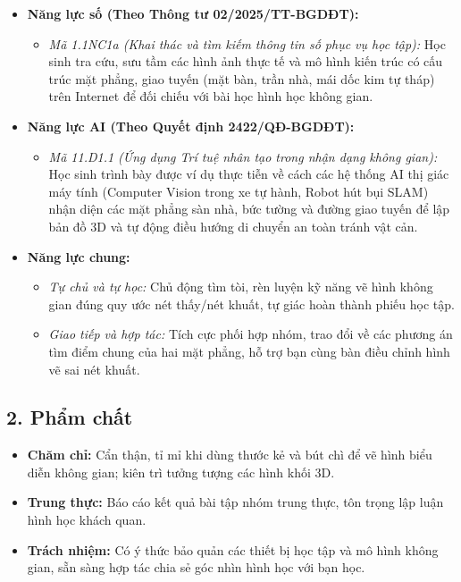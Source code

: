 \documentclass[12pt, a4paper]{article}
\begin{document}
\begin{itemize}[leftmargin=1.2cm]
    \item \textbf{Năng lực số (Theo Thông tư 02/2025/TT-BGDĐT):}
    \begin{itemize}[leftmargin=0.6cm]
        \item \textit{Mã 1.1NC1a (Khai thác và tìm kiếm thông tin số phục vụ học tập):} Học sinh tra cứu, sưu tầm các hình ảnh thực tế và mô hình kiến trúc có cấu trúc mặt phẳng, giao tuyến (mặt bàn, trần nhà, mái dốc kim tự tháp) trên Internet để đối chiếu với bài học hình học không gian.
    \end{itemize}

    \item \textbf{Năng lực AI (Theo Quyết định 2422/QĐ-BGDĐT):}
    \begin{itemize}[leftmargin=0.6cm]
        \item \textit{Mã 11.D1.1 (Ứng dụng Trí tuệ nhân tạo trong nhận dạng không gian):} Học sinh trình bày được ví dụ thực tiễn về cách các hệ thống AI thị giác máy tính (Computer Vision trong xe tự hành, Robot hút bụi SLAM) nhận diện các mặt phẳng sàn nhà, bức tường và đường giao tuyến để lập bản đồ 3D và tự động điều hướng di chuyển an toàn tránh vật cản.
    \end{itemize}

    \item \textbf{Năng lực chung:}
    \begin{itemize}[leftmargin=0.6cm]
        \item \textit{Tự chủ và tự học:} Chủ động tìm tòi, rèn luyện kỹ năng vẽ hình không gian đúng quy ước nét thấy/nét khuất, tự giác hoàn thành phiếu học tập.
        \item \textit{Giao tiếp và hợp tác:} Tích cực phối hợp nhóm, trao đổi về các phương án tìm điểm chung của hai mặt phẳng, hỗ trợ bạn cùng bàn điều chỉnh hình vẽ sai nét khuất.
    \end{itemize}
\end{itemize}

\subsection*{2. Phẩm chất}

\begin{itemize}[leftmargin=1.2cm]
    \item \textbf{Chăm chỉ:} Cẩn thận, tỉ mỉ khi dùng thước kẻ và bút chì để vẽ hình biểu diễn không gian; kiên trì tưởng tượng các hình khối 3D.
    \item \textbf{Trung thực:} Báo cáo kết quả bài tập nhóm trung thực, tôn trọng lập luận hình học khách quan.
    \item \textbf{Trách nhiệm:} Có ý thức bảo quản các thiết bị học tập và mô hình không gian, sẵn sàng hợp tác chia sẻ góc nhìn hình học với bạn học.
\end{itemize}
\end{document}
